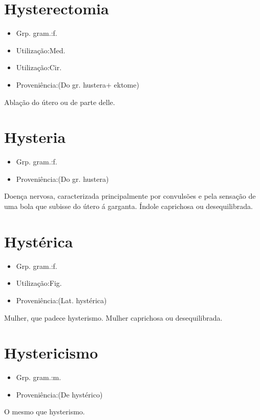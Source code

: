 \documentclass{article}
\begin{document}
\section{Hysterectomia}
\begin{itemize}
\item {Grp. gram.:f.}
\end{itemize}
\begin{itemize}
\item {Utilização:Med.}
\end{itemize}
\begin{itemize}
\item {Utilização:Cir.}
\end{itemize}
\begin{itemize}
\item {Proveniência:(Do gr. \textunderscore hustera\textunderscore  + \textunderscore ektome\textunderscore )}
\end{itemize}
Ablação do útero ou de parte delle.
\section{Hysteria}
\begin{itemize}
\item {Grp. gram.:f.}
\end{itemize}
\begin{itemize}
\item {Proveniência:(Do gr. \textunderscore hustera\textunderscore )}
\end{itemize}
Doença nervosa, caracterizada principalmente por convulsões e pela sensação de uma bola que subisse do útero á garganta.
Índole caprichosa ou desequilibrada.
\section{Hystérica}
\begin{itemize}
\item {Grp. gram.:f.}
\end{itemize}
\begin{itemize}
\item {Utilização:Fig.}
\end{itemize}
\begin{itemize}
\item {Proveniência:(Lat. \textunderscore hystérica\textunderscore )}
\end{itemize}
Mulher, que padece hysterismo.
Mulher caprichosa ou desequilibrada.
\section{Hystericismo}
\begin{itemize}
\item {Grp. gram.:m.}
\end{itemize}
\begin{itemize}
\item {Proveniência:(De \textunderscore hystérico\textunderscore )}
\end{itemize}
O mesmo que \textunderscore hysterismo\textunderscore .
\end{document}
